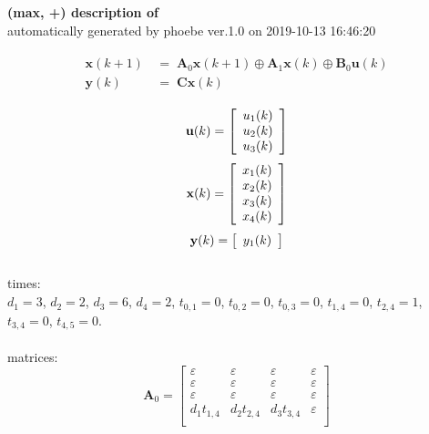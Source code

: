 \documentclass[11pt, a4paper, fleqn]{article}
\begin{document}
\noindent
\textbf{(max, +) description of} \texttt{\currfilebase} \\
automatically generated by phoebe ver.1.0 on 2019-10-13 16:46:20 

\begin{align}\begin{split}
\mathbf{x}(k+1) & \, = \; \mathbf{A}_{0}\mathbf{x}(k+1) \oplus \mathbf{A}_{1}\mathbf{x}(k) \oplus \mathbf{B}_{0}\mathbf{u}(k)\\
\mathbf{y}(k) & \, = \; \mathbf{Cx}(k)
\end{split}\end{align}

\begin{equation*}
\mathbf{u}(k) = 
\left[\begin{array}{*{20}c}
  u_1(k) \\
  u_2(k) \\
  u_3(k) \\
\end{array}\right]
\end{equation*}
\begin{equation*}
\mathbf{x}(k) = 
\left[\begin{array}{*{20}c}
  x_1(k) \\
  x_2(k) \\
  x_3(k) \\
  x_4(k) \\
\end{array}\right]
\end{equation*}
\begin{equation*}
\mathbf{y}(k) = 
\left[\begin{array}{*{20}c}
  y_1(k) \\
\end{array}\right]
\end{equation*}
\noindent\\
times:\\
$d_1 = 3$, $d_2 = 2$, $d_3 = 6$, $d_4 = 2$, $t_{0,1} = 0$, $t_{0,2} = 0$, $t_{0,3} = 0$, $t_{1,4} = 0$, $t_{2,4} = 1$, $t_{3,4} = 0$, $t_{4,5} = 0$.\\
\\
matrices:
\begin{equation*}
\mathbf{A}_{0} = 
\left[\begin{array}{ cccc }
\varepsilon	&\varepsilon	&\varepsilon	&\varepsilon\\
\varepsilon	&\varepsilon	&\varepsilon	&\varepsilon\\
\varepsilon	&\varepsilon	&\varepsilon	&\varepsilon\\
d_1t_{1,4}	&d_2t_{2,4}	&d_3t_{3,4}	&\varepsilon\\
\end{array}\right]
\end{equation*}
\end{document}
